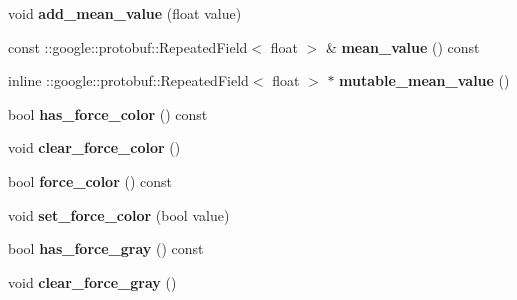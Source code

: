 \begin{DoxyCompactItemize}
\mbox{\label{classcaffe_1_1_transformation_parameter_a77f824ddaa858caadb248109b924e991}} 
void {\bfseries add\+\_\+mean\+\_\+value} (float value)
\item 
\mbox{\label{classcaffe_1_1_transformation_parameter_a806219057bb7bbbbe5309673f802aabf}} 
const \+::google\+::protobuf\+::\+Repeated\+Field$<$ float $>$ \& {\bfseries mean\+\_\+value} () const
\item 
\mbox{\label{classcaffe_1_1_transformation_parameter_a31181692ee29cd970ce106ee7629799c}} 
inline \+::google\+::protobuf\+::\+Repeated\+Field$<$ float $>$ $\ast$ {\bfseries mutable\+\_\+mean\+\_\+value} ()
\item 
\mbox{\label{classcaffe_1_1_transformation_parameter_a389fbf86c3d9582c2f67d15882d45fc2}} 
bool {\bfseries has\+\_\+force\+\_\+color} () const
\item 
\mbox{\label{classcaffe_1_1_transformation_parameter_a654260dfe124327a45f194e9628d36fb}} 
void {\bfseries clear\+\_\+force\+\_\+color} ()
\item 
\mbox{\label{classcaffe_1_1_transformation_parameter_a2bf51629de06c251785e1aac22159cfc}} 
bool {\bfseries force\+\_\+color} () const
\item 
\mbox{\label{classcaffe_1_1_transformation_parameter_abc64379295da9d53407434eb8b2de2bb}} 
void {\bfseries set\+\_\+force\+\_\+color} (bool value)
\item 
\mbox{\label{classcaffe_1_1_transformation_parameter_a19f3074ad745c8f6eeedf8ad75f0a443}} 
bool {\bfseries has\+\_\+force\+\_\+gray} () const
\item 
\mbox{\label{classcaffe_1_1_transformation_parameter_af25b6680e1dfea687573701db59ce684}} 
void {\bfseries clear\+\_\+force\+\_\+gray} ()
\item 
\mbox{\label{classcaffe_1_1_transformation_parameter_af223aeaa65456a1e0bb440d7aa3f3e10}} 

\end{DoxyCompactItemize}
